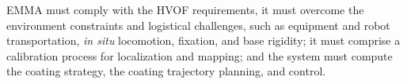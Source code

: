 EMMA must comply with the HVOF requirements, it must overcome the environment
constraints and logistical challenges, such as equipment
and robot transportation, \textit{in situ} locomotion, fixation, and base
rigidity; it must comprise a calibration process for localization and
mapping; and the system must compute the coating strategy, the coating
trajectory planning, and control.

